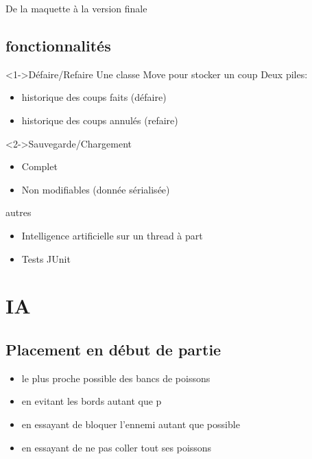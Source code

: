 \documentclass{beamer}
\begin{document}
\begin{frame}{De la maquette à la version finale}
\subsection{fonctionnalités}
\begin{frame}{}
\begin{block}<1->{Défaire/Refaire} %
Une classe Move pour stocker un coup \newline
Deux piles: 
\begin{itemize}
 \item historique des coups faits (défaire)
 \item historique des coups annulés (refaire)
\end{itemize}
\end{block}
\begin{block}<2->{Sauvegarde/Chargement}
\begin{itemize}
\item Complet
\item Non modifiables (donnée sérialisée)
\end{itemize}
\end{block}
\end{frame}

\begin{frame}{}
\begin{block}{autres}
\begin{itemize}
\item<1-> Intelligence artificielle sur un thread à part
\item<2-> Tests JUnit
\end{itemize}
\end{block}
\end{frame}


\section{IA}

\subsection{Placement en début de partie}
\begin{frame}{}
\begin{block}{}
\begin{itemize}
 \item<1-> le plus proche possible des bancs de poissons
 \item<2-> en evitant les bords autant que p
 \item<3-> en essayant de bloquer l'ennemi autant que possible
 \item<4-> en essayant de ne pas coller tout ses poissons
\end{itemize}
\end{block}
\end{frame}


\end{frame}
\end{document}
